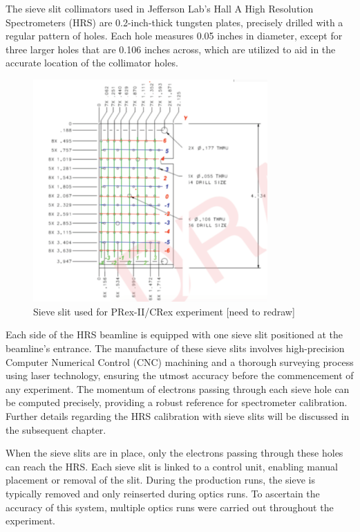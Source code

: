 The sieve slit collimators used in Jefferson Lab's Hall A High Resolution Spectrometers (HRS) are 0.2-inch-thick tungsten plates, precisely drilled with a regular pattern of holes. Each hole measures 0.05 inches in diameter, except for three larger holes that are 0.106 inches across, which are utilized to aid in the accurate location of the collimator holes.
\begin{figure}[!htbp]
    \centering
    \includegraphics[width=0.8\textwidth]{images/chap3/sive_slit.png}
    \caption{Sieve slit used for PRex-II/CRex experiment [need to redraw]}
    \label{fig:enter-label}
\end{figure}
Each side of the HRS beamline is equipped with one sieve slit positioned at the beamline's entrance. The manufacture of these sieve slits involves high-precision Computer Numerical Control (CNC) machining and a thorough surveying process using laser technology, ensuring the utmost accuracy before the commencement of any experiment. The momentum of electrons passing through each sieve hole can be computed precisely, providing a robust reference for spectrometer calibration. Further details regarding the HRS calibration with sieve slits will be discussed in the subsequent chapter.

When the sieve slits are in place, only the electrons passing through these holes can reach the HRS. Each sieve slit is linked to a control unit, enabling manual placement or removal of the slit. During the production runs, the sieve is typically removed and only reinserted during optics runs. To ascertain the accuracy of this system, multiple optics runs were carried out throughout the experiment. 

